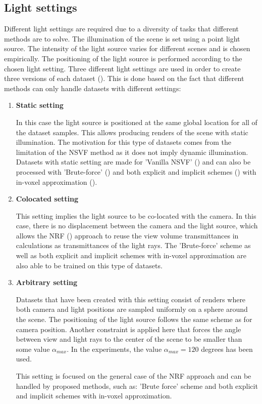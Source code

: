 \subsection{Light settings}

Different light settings are required due to a diversity of tasks that different methods are to solve.
The illumination of the scene is set using a point light source.
The intensity of the light source varies for different scenes and is chosen empirically.
The positioning of the light source is performed according to the chosen light setting.
Three different light settings are used in order to create three versions of each dataset ().
This is done based on the fact that different methods can only handle datasets with different settings:
\begin{enumerate}
    \item \textbf{Static setting}
    
    In this case the light source is positioned at the same global location for all of the dataset samples.
    This allows producing renders of the scene with static illumination.
    The motivation for this type of datasets comes from the limitation of the NSVF method
    as it does not imply dynamic illumination.
    Datasets with static setting are made for 'Vanilla NSVF' (\cite{liu2021neural})
    and can also be processed with 'Brute-force' ()
    and both explicit and implicit schemes ()
    with in-voxel approximation ().
    
    \item \textbf{Colocated setting}
    
    This setting implies the light source to be co-located with the camera.
    In this case, there is no displacement between the camera and the light source,
    which allows the NRF (\cite{bi2020neural}) approach to reuse the view volume transmittances
    in calculations as transmittances of the light rays.
    The 'Brute-force' scheme as well as both explicit and implicit schemes
    with in-voxel approximation are also able to be trained on this type of datasets.
    
    \item \textbf{Arbitrary setting}
    
    Datasets that have been created with this setting consist of renders
    where both camera and light positions are sampled uniformly on a sphere around the scene.
    The positioning of the light source follows the same scheme as for camera position.
    Another constraint is applied here that forces the angle
    between view and light rays to the center of the scene to be smaller
    than some value $\alpha_{max}$.
    In the experiments, the value $\alpha_{max} = 120$ degrees has been used.
    
    This setting is focused on the general case of the NRF approach
    and can be handled by proposed methods, such as: 'Brute force' scheme
    and both explicit and implicit schemes with in-voxel approximation.
\end{enumerate}

